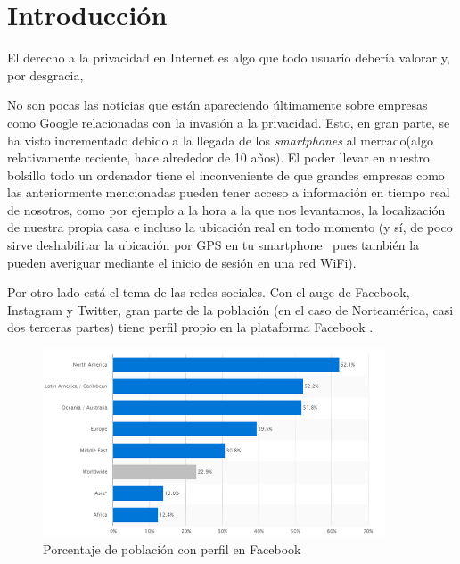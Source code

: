 \chapter{Introducción} 
\label{chap:intro}

\vspace{-0.2cm}

El derecho a la privacidad en Internet es algo que todo usuario
debería valorar y, por desgracia, 

No son pocas las noticias que están apareciendo últimamente sobre
empresas como Google relacionadas con la invasión a la
privacidad. Esto, en gran parte, se ha visto incrementado debido a la
llegada de los \textit{smartphones} al mercado(algo relativamente
reciente, hace alrededor de 10 años). El poder llevar en nuestro
bolsillo todo un ordenador tiene el inconveniente de que grandes
empresas como las anteriormente mencionadas pueden tener acceso a
información en tiempo real de nosotros, como por ejemplo a la hora a
la que nos levantamos, la localización de nuestra propia casa e
incluso la ubicación real en todo momento (y sí, de poco sirve
deshabilitar la ubicación por GPS en tu smartphone~\cite{article:GPSTracking} pues también la
pueden averiguar mediante el inicio de sesión en una red WiFi).

Por otro lado está el tema de las redes sociales. Con el auge de
Facebook, Instagram y Twitter, gran parte de la población (en el caso
de Norteamérica, casi dos terceras partes) tiene perfil propio en la
plataforma Facebook .

\begin{figure}[h]
	\centerline{
		\mbox{\includegraphics[width=4.00in]{images/sn.png}}
	}
	\caption{Porcentaje de población con perfil en Facebook~\cite{article:FacebookStats} }
	\label{fig:FBStats}
\end{figure}

